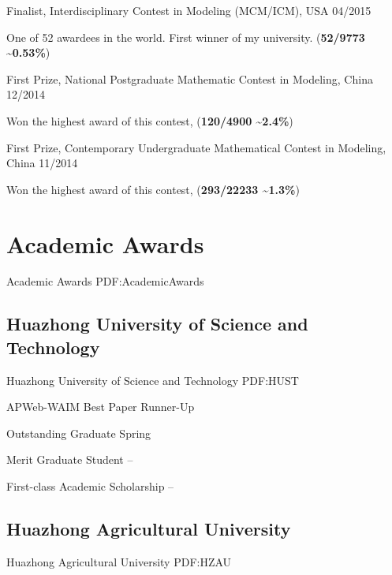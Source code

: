 \documentclass[letterpaper,10pt,oneside]{article}
\begin{document}
\begin{body}
\BulletItem
Finalist, Interdisciplinary Contest in Modeling (MCM/ICM), USA
\hfill
04/2015
\begin{detail}
\SubItem
One of 52 awardees in the world. First winner of my university. (\textbf{52/9773 \textasciitilde0.53\%})
\end{detail}

\Gap
\BulletItem
First Prize, National Postgraduate Mathematic Contest in Modeling, China
\hfill
12/2014
\begin{detail}
\SubItem
Won the highest award of this contest, 
(\textbf{120/4900 \textasciitilde2.4\%}) 
\end{detail}

\Gap
\BulletItem
First Prize, Contemporary Undergraduate Mathematical Contest in Modeling, China
\hfill
11/2014
\begin{detail}
\SubItem
Won the highest award of this contest,
(\textbf{293/22233 \textasciitilde1.3\%})
\end{detail}


\section
{Academic Awards}
{Academic Awards}
{PDF:AcademicAwards}

\subsection
{Huazhong University of Science and Technology}
{Huazhong University of Science and Technology}
{PDF:HUST}
\GapNoBreak

\BulletItem
APWeb-WAIM Best Paper Runner-Up
\hfill
{}

\GapNoBreak

\BulletItem
Outstanding Graduate
\hfill
Spring 

\GapNoBreak

\BulletItem
Merit Graduate Student
\hfill
{} --

\GapNoBreak
\BulletItem
First-class Academic Scholarship
\hfill
{} --
\BigGap
\GapNoBreak
\subsection
{Huazhong Agricultural University}
{Huazhong Agricultural University}
{PDF:HZAU}


\end{body}
\end{document}
